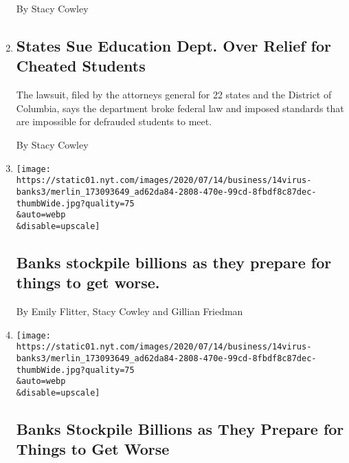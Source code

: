 \begin{enumerate}
  By Stacy Cowley
\item
  \href{/2020/07/15/business/student-loans-education-department-betsy-devos.html}{}

  \hypertarget{states-sue-education-dept-over-relief-for-cheated-students}{%
  \subsection{States Sue Education Dept. Over Relief for Cheated
  Students}\label{states-sue-education-dept-over-relief-for-cheated-students}}

  The lawsuit, filed by the attorneys general for 22 states and the
  District of Columbia, says the department broke federal law and
  imposed standards that are impossible for defrauded students to meet.

  By Stacy Cowley
\item
  \href{/live/2020/07/14/business/stock-market-updates-coronavirus/banks-stockpile-billions-as-they-prepare-for-things-to-get-worse}{}

  \texttt{[image: https://static01.nyt.com/images/2020/07/14/business/14virus-banks3/merlin\_173093649\_ad62da84-2808-470e-99cd-8fbdf8c87dec-thumbWide.jpg?quality=75\\\&auto=webp\\\&disable=upscale]}

  \hypertarget{banks-stockpile-billions-as-they-prepare-for-things-to-get-worse}{%
  \subsection{Banks stockpile billions as they prepare for things to get
  worse.}\label{banks-stockpile-billions-as-they-prepare-for-things-to-get-worse}}

  By Emily Flitter, Stacy Cowley and Gillian Friedman
\item
  \href{/2020/07/14/business/big-banks-quarterly-results.html}{}

  \texttt{[image: https://static01.nyt.com/images/2020/07/14/business/14virus-banks3/merlin\_173093649\_ad62da84-2808-470e-99cd-8fbdf8c87dec-thumbWide.jpg?quality=75\\\&auto=webp\\\&disable=upscale]}

  \hypertarget{banks-stockpile-billions-as-they-prepare-for-things-to-get-worse-1}{%
  \subsection{Banks Stockpile Billions as They Prepare for Things to Get
  Worse}\label{banks-stockpile-billions-as-they-prepare-for-things-to-get-worse-1}}


\end{enumerate}
